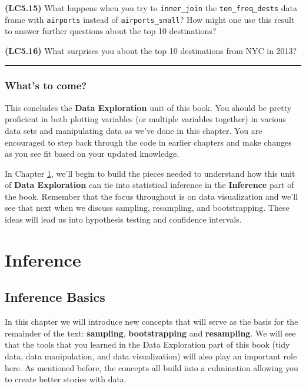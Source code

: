 \documentclass[]{tufte-book}
\begin{document}
\textbf{(LC5.15)} What happens when you try to \texttt{inner\_join} the
\texttt{ten\_freq\_dests} data frame with \texttt{airports} instead of
\texttt{airports\_small}? How might one use this result to answer
further questions about the top 10 destinations?

\textbf{(LC5.16)} What surprises you about the top 10 destinations from
NYC in 2013?

\begin{center}\rule{\linewidth}{\linethickness}\end{center}

\section{What's to come?}\label{whats-to-come-2}

This concludes the \textbf{Data Exploration} unit of this book. You
should be pretty proficient in both plotting variables (or multiple
variables together) in various data sets and manipulating data as we've
done in this chapter. You are encouraged to step back through the code
in earlier chapters and make changes as you see fit based on your
updated knowledge.

In Chapter \ref{infer-basics}, we'll begin to build the pieces needed to
understand how this unit of \textbf{Data Exploration} can tie into
statistical inference in the \textbf{Inference} part of the book.
Remember that the focus throughout is on data visualization and we'll
see that next when we discuss sampling, resampling, and bootstrapping.
These ideas will lead us into hypothesis testing and confidence
intervals.

\part{Inference}\label{part-inference}


\chapter{Inference Basics}\label{infer-basics}

In this chapter we will introduce new concepts that will serve as the
basis for the remainder of the text: \textbf{sampling},
\textbf{bootstrapping} and \textbf{resampling}. We will see that the
tools that you learned in the Data Exploration part of this book (tidy
data, data manipulation, and data visualization) will also play an
important role here. As mentioned before, the concepts all build into a
culmination allowing you to create better stories with data.
\end{document}
